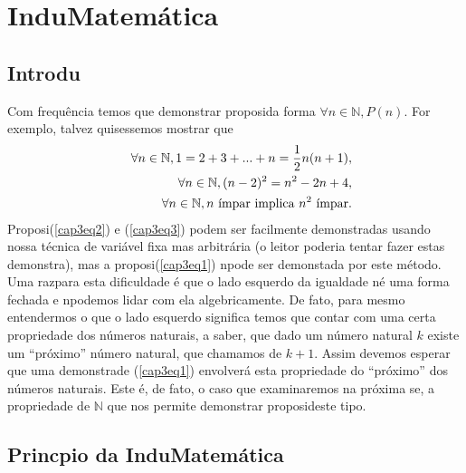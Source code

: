 \chapter{Indu\cao Matem\'atica}

\section{Introdu\cao}\label{cap3introd}

Com frequ\^encia temos que demonstrar proposi\coes da forma $\forall n\in\mathbb{N}, P(n)$. For exemplo, talvez quisessemos mostrar que
\begin{eqnarray}
&& \forall n\in\mathbb{N}, 1=2+3+...+n=\frac{1}{2}n(n+1),\label{cap3eq1}\\
&& \forall n\in\mathbb{N}, (n-2)^2=n^2-2n+4,\label{cap3eq2}\\
&& \forall n\in\mathbb{N}, n \textrm{ \ih mpar implica } n^2 \textrm{ \ih mpar}. \label{cap3eq3}
\end{eqnarray}
Proposi\coes (\ref{cap3eq2}) e (\ref{cap3eq3}) podem ser facilmente demonstradas usando nossa t\'ecnica de vari\'avel fixa mas arbitr\'aria (o leitor poderia tentar fazer estas demonstra\cois), mas a proposi\cao (\ref{cap3eq1}) n\ao pode ser demonstada por este m\'etodo. Uma raz\ao para esta dificuldade \'e que o lado esquerdo da igualdade n\ao \'e uma forma fechada e n\ao podemos lidar com ela algebricamente. De fato, para mesmo entendermos o que o lado esquerdo significa temos que contar com uma certa propriedade dos n\'umeros naturais, a saber, que dado um n\'umero natural $k$ existe um ``pr\'oximo'' n\'umero natural, que chamamos de $k+1$. Assim devemos esperar que uma demonstra\cao de (\ref{cap3eq1}) envolver\'a esta propriedade do ``pr\'oximo'' dos n\'umeros naturais. Este \'e, de fato, o caso que examinaremos na pr\'oxima se\caoi, a propriedade de $\mathbb{N}$ que nos permite demonstrar proposi\coes deste tipo.

\section{Princ\ih pio da Indu\cao Matem\'atica}\label{inducao}


